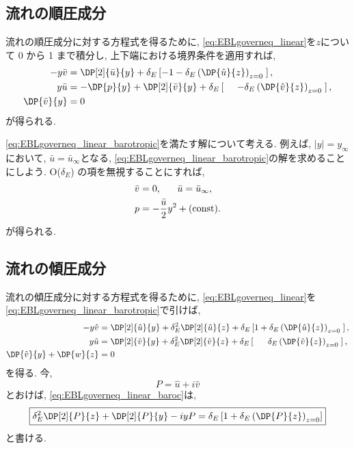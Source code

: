 \subsection{流れの順圧成分}
流れの順圧成分に対する方程式を得るために, 
\eqref{eq:EBLgoverneq_linear}を$z$について 0 から 1 まで積分し, 
上下端における境界条件を適用すれば, 
\begin{subequations}
 \begin{align}
   - y\bar{v} &=  \DP[2]{\bar{u}}{y} + \delta_E \left[ -1 - \delta_E \left(\DP{\hat{u}}{z}\right)_{z=0} \; \right], \\
     y\bar{u} &= - \DP{p}{y} + \DP[2]{\bar{v}}{y} + \delta_E \left[ \;\;\;\;\;  - \delta_E \left(\DP{\hat{v}}{z}\right)_{z=0} \; \right], \\
   \DP{\bar{v}}{y}  &= 0
 \end{align}
\label{eq:EBLgoverneq_linear_barotropic}
\end{subequations}
が得られる. 

\eqref{eq:EBLgoverneq_linear_barotropic}を満たす解について考える. 
例えば, $|y|=y_\infty$において, $\bar{u} = \bar{u}_\infty$となる, 
\eqref{eq:EBLgoverneq_linear_barotropic}の解を求めることにしよう. 
O($\delta_E$) の項を無視することにすれば, 
\begin{align}
  \bar{v} &= 0, \;\;\;\;\;\; \bar{u} = \bar{u}_\infty, \\
  p &= - \dfrac{\bar{u}}{2} y^2 + ({\rm const}). 
\end{align}
が得られる. 

\subsection{流れの傾圧成分}
流れの傾圧成分に対する方程式を得るために, 
\eqref{eq:EBLgoverneq_linear}を\eqref{eq:EBLgoverneq_linear_barotropic}で引けば, 
\begin{subequations}
 \begin{align}
   - y\hat{v} &=  \DP[2]{\hat{u}}{y} + \delta_E^2 \DP[2]{\hat{u}}{z} + \delta_E \left[ 1 + \delta_E \left(\DP{\hat{u}}{z}\right)_{z=0} \; \right], \\
     y\hat{u} &=  \DP[2]{\hat{v}}{y} + \delta_E^2 \DP[2]{\hat{v}}{z} + \delta_E \left[ \;\;\;\;\;\;  \delta_E \left(\DP{\hat{v}}{z}\right)_{z=0} \; \right], \\
   \DP{\hat{v}}{y} + \DP{w}{z} &= 0
 \end{align}
\label{eq:EBLgoverneq_linear_baroc}
\end{subequations}
を得る. 
今, 
\begin{equation}
  P = \hat{u} + i \hat{v}
\end{equation}
とおけば, \eqref{eq:EBLgoverneq_linear_baroc}は, 
\begin{equation}
\boxed{
  \delta_E^2 \DP[2]{P}{z} + \DP[2]{P}{y} - iyP = \delta_E \left[ 1 + \delta_E \left(\DP{P}{z}\right)_{z=0} \right]
}
\label{eq:EBLgoverneq_linear_baroc_P}
\end{equation}
と書ける. 

